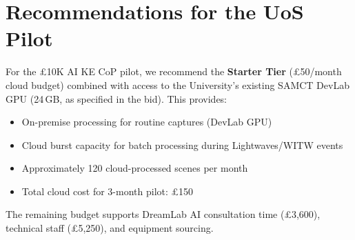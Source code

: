 \section{Recommendations for the UoS Pilot}

\begin{keyfinding}
For the \pounds10K AI KE CoP pilot, we recommend the \textbf{Starter Tier} (\pounds50/month cloud budget) combined with access to the University's existing SAMCT DevLab GPU (24\,GB, as specified in the bid). This provides:
\begin{itemize}
  \item On-premise processing for routine captures (DevLab GPU)
  \item Cloud burst capacity for batch processing during Lightwaves/WITW events
  \item Approximately 120 cloud-processed scenes per month
  \item Total cloud cost for 3-month pilot: \pounds150
\end{itemize}
The remaining budget supports DreamLab AI consultation time (\pounds3,600), technical staff (\pounds5,250), and equipment sourcing.
\end{keyfinding}
